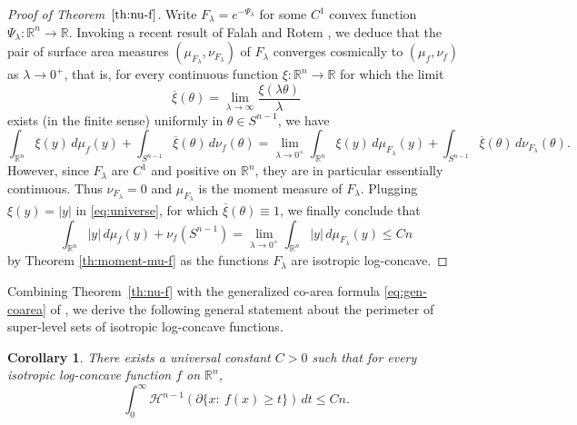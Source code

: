 \documentclass[11pt,leqno]{article}
\newtheorem{corollary}[theorem]{Corollary}
\theoremstyle{definition}
\theoremstyle{remark}
\numberwithin{equation}{section}
\newcommand{\ls}{\leqslant}
\newcommand{\gr}{\geqslant}
\newcommand{\1}{\textbf{1}}
\newcommand{\R}{\mathbb{R}}
\begin{document}
\begin{proof}[Proof of Theorem~$\ref{th:nu-f}$]
Write $F_\lambda = e^{-\Psi_\lambda}$ for some $C^1$ convex function $\Psi_\lambda:\R^n\to\R$. Invoking a recent result of Falah and Rotem \cite[Theorem~1.9]{FR26}, we deduce that the pair of surface area measures $(\mu_{F_\lambda}, \nu_{F_\lambda})$ of $F_\lambda$ converges cosmically to $(\mu_f, \nu_f)$ as $\lambda\to0^+$, that is, for every continuous function $\xi:\R^n\to\R$ for which the limit
$$\overline{\xi}(\theta) = \lim_{\lambda\to\infty} \frac{\xi(\lambda \theta)}{\lambda}$$
exists (in the finite sense) uniformly in $\theta\in S^{n-1}$, we have
\begin{equation} \label{eq:universe}
\int_{\R^n} \xi(y) \, d\mu_f(y) + \int_{S^{n-1}}\overline{\xi}(\theta)\, d\nu_f(\theta) = \lim_{\lambda\to 0^+} \int_{\R^n} \xi(y) \, d\mu_{F_\lambda}(y) + \int_{S^{n-1}}\overline{\xi}(\theta)\, d\nu_{F_\lambda}(\theta).
\end{equation}
However, since $F_\lambda$ are $C^1$ and positive on $\R^n$, they are in particular essentially continuous. Thus $\nu_{F_\lambda}=0$ and $\mu_{F_\lambda}$ is the moment measure of $F_\lambda$. Plugging $\xi(y)=|y|$ in \eqref{eq:universe}, for which $\overline{\xi}(\theta)\equiv1$, we finally conclude that
$$\int_{\R^n} |y| \, d\mu_f(y) + \nu_f(S^{n-1}) = \lim_{\lambda\to0^+} \int_{\R^n} |y| \, d\mu_{F_\lambda}(y) \ls Cn$$
by Theorem \ref{th:moment-mu-f} as the functions $F_\lambda$ are isotropic log-concave.
\end{proof}

Combining Theorem~\ref{th:nu-f} with the generalized co-area formula \eqref{eq:gen-coarea} of \cite[Theorem~3.2]{Rotem-2022}, we derive the following general statement about the perimeter of super-level sets of isotropic log-concave functions.

\begin{corollary}\label{cor:H}
There exists a universal constant $C>0$ such that for every isotropic log-concave function $f$ on $\mathbb{R}^n$,
\begin{equation}
\int_0^\infty \mathcal{H}^{n-1}(\partial \{x: \ f(x)\gr t\}) \, dt \ls Cn. \end{equation}
\end{corollary}

\bigskip
\end{document}

